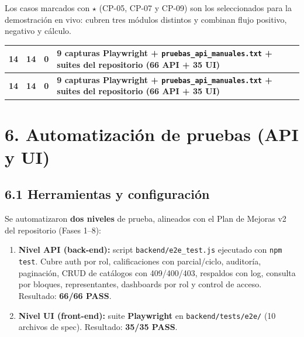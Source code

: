 \documentclass[11pt,a4paper]{article}
\begin{document}
Los casos marcados con {$\star$} (CP-05, CP-07 y CP-09) son los seleccionados para la demostración en vivo: cubren tres módulos distintos y combinan flujo positivo, negativo y cálculo.


{\small
\begin{longtable}{|p{}|p{}|p{}|p{}|}
\rowcolor{UTECblue}\color{white}\bfseries 14 & \color{white}\bfseries 14 & \color{white}\bfseries 0 & \color{white}\bfseries 9 capturas Playwright + \texttt{pruebas\_api\_manuales.txt} + suites del repositorio (66 API + 35 UI) \\ \hline
\endfirsthead
\rowcolor{UTECblue}\color{white}\bfseries 14 & \color{white}\bfseries 14 & \color{white}\bfseries 0 & \color{white}\bfseries 9 capturas Playwright + \texttt{pruebas\_api\_manuales.txt} + suites del repositorio (66 API + 35 UI) \\ \hline
\endhead
\end{longtable}}


\section*{6. Automatización de pruebas (API y UI)}


\subsection*{6.1 Herramientas y configuración}


Se automatizaron \textbf{dos niveles} de prueba, alineados con el Plan de Mejoras v2 del repositorio (Fases 1--8):


\begin{enumerate}[leftmargin=*]
\item \textbf{Nivel API (back-end):} script \texttt{backend/e2e\_test.js} ejecutado con \texttt{npm test}. Cubre auth por rol, calificaciones con parcial/ciclo, auditoría, paginación, CRUD de catálogos con 409/400/403, respaldos con log, consulta por bloques, representantes, dashboards por rol y control de acceso. Resultado: \textbf{66/66 PASS}.
\item \textbf{Nivel UI (front-end):} suite \textbf{Playwright} en \texttt{backend/tests/e2e/} (10 archivos de spec). Resultado: \textbf{35/35 PASS}.
\end{enumerate}
\end{document}
